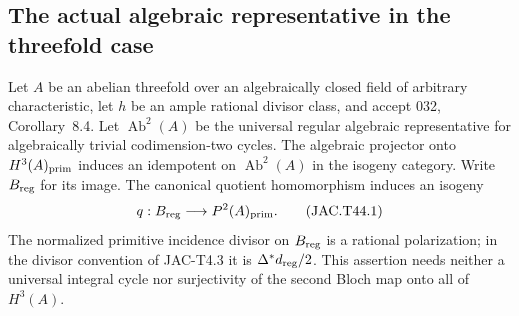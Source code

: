 \subsection{The actual algebraic representative in the threefold case}

\begin{theorem}[JAC-T4.4]
\label{thm:T44}
Let $A$ be an abelian threefold over an algebraically closed field of
arbitrary characteristic, let $h$ be an ample rational divisor class,
and accept 032, Corollary~8.4. Let $\operatorname{Ab}^2(A)$ be the
universal regular algebraic representative for algebraically trivial
codimension-two cycles. The algebraic projector onto
$H^3(A)_{\rm prim}$ induces an idempotent on
$\operatorname{Ab}^2(A)$ in the isogeny category. Write $B_{\rm reg}$
for its image. The canonical quotient homomorphism induces an isogeny
\[
 q:B_{\rm reg}\longrightarrow P^2(A)_{\rm prim}.
                                                        \tag{JAC.T44.1}
\]
The normalized primitive incidence divisor on $B_{\rm reg}$ is a
rational polarization; in the divisor convention of JAC-T4.3 it is
$\Delta^*d_{\rm reg}/2$. This assertion needs neither a universal
integral cycle nor surjectivity of the second Bloch map onto all of
$H^3(A)$.
\end{theorem}

